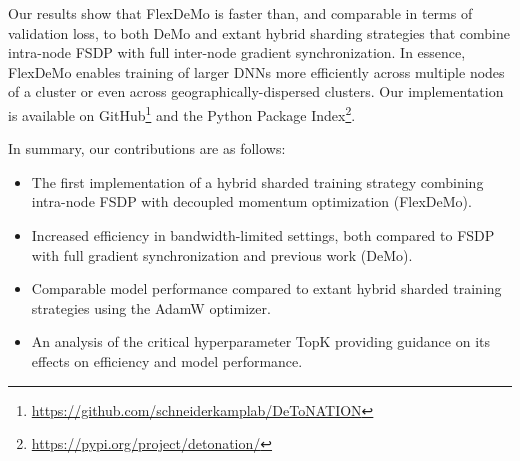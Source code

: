 Our results show that FlexDeMo is faster than, and  comparable in terms of validation loss, to both DeMo and extant hybrid sharding strategies that combine intra-node FSDP with full inter-node gradient synchronization. In essence, FlexDeMo enables training of larger DNNs more efficiently across multiple nodes of a cluster or even across geographically-dispersed clusters.
Our implementation is available on GitHub\footnote{\url{https://github.com/schneiderkamplab/DeToNATION}} and the Python Package Index\footnote{\url{https://pypi.org/project/detonation/}}.

In summary, our contributions are as follows:
\begin{itemize}
    \item The first implementation of a hybrid sharded training strategy combining intra-node FSDP with decoupled momentum optimization (FlexDeMo). 
    \item Increased efficiency in bandwidth-limited settings, both compared to FSDP with full gradient synchronization and previous work (DeMo).
    \item Comparable model performance compared to extant hybrid sharded training strategies using the AdamW optimizer. 
    \item An analysis of the critical hyperparameter TopK providing guidance on its effects on efficiency and model performance.
\end{itemize}